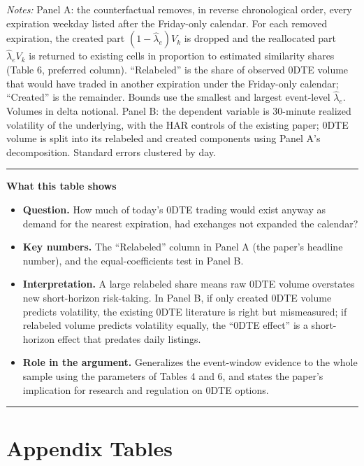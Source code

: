 \documentclass[11pt]{article}
\newenvironment{tableshows}
  {\begin{center}\begin{minipage}{0.95\textwidth}\small
   \hrule\vspace{4pt}
   \textbf{What this table shows}\par
   \begin{itemize}[leftmargin=12pt,topsep=4pt,itemsep=4pt,parsep=0pt]}
  {\end{itemize}\vspace{2pt}\hrule\end{minipage}\end{center}}
\begin{document}
\begin{table}[H]
\begin{threeparttable}
\begin{tablenotes}
\footnotesize
\item[] \textit{Notes:} Panel A: the counterfactual removes, in reverse chronological order, every expiration weekday listed after the Friday-only calendar. For each removed expiration, the created part $(1 - \hat\lambda_e)V_k$ is dropped and the reallocated part $\hat\lambda_e V_k$ is returned to existing cells in proportion to estimated similarity shares (Table 6, preferred column). ``Relabeled'' is the share of observed 0DTE volume that would have traded in another expiration under the Friday-only calendar; ``Created'' is the remainder. Bounds use the smallest and largest event-level $\hat\lambda_e$. Volumes in delta notional. Panel B: the dependent variable is 30-minute realized volatility of the underlying, with the HAR controls of the existing paper; 0DTE volume is split into its relabeled and created components using Panel A's decomposition. Standard errors clustered by day.
\end{tablenotes}
\end{threeparttable}
\end{table}

\begin{tableshows}
\item \textbf{Question.} How much of today's 0DTE trading would exist anyway as demand for the nearest expiration, had exchanges not expanded the calendar?
\item \textbf{Key numbers.} The ``Relabeled'' column in Panel A (the paper's headline number), and the equal-coefficients test in Panel B.
\item \textbf{Interpretation.} A large relabeled share means raw 0DTE volume overstates new short-horizon risk-taking. In Panel B, if only created 0DTE volume predicts volatility, the existing 0DTE literature is right but mismeasured; if relabeled volume predicts volatility equally, the ``0DTE effect'' is a short-horizon effect that predates daily listings.
\item \textbf{Role in the argument.} Generalizes the event-window evidence to the whole sample using the parameters of Tables 4 and 6, and states the paper's implication for research and regulation on 0DTE options.
\end{tableshows}

\clearpage
\section*{Appendix Tables}
\end{document}
